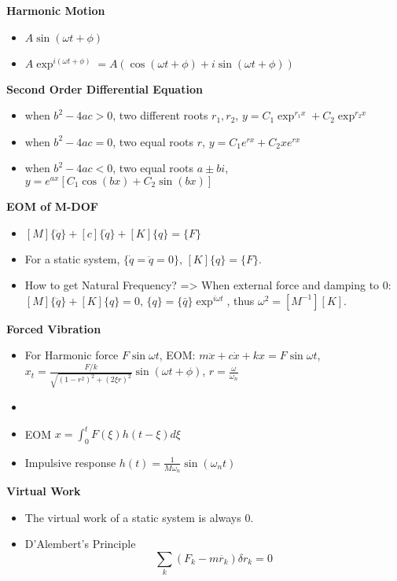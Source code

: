 \documentclass{article}
\begin{document}
\thispagestyle{empty}

\begin{multicols*}{2}

  \noindent\textbf{Harmonic Motion}
  \begin{itemize}
    \item $A \sin(\omega t + \phi)$
    \item $A \exp^{i(\omega t + \phi)} = A(\cos(\omega t + \phi) + i\sin(\omega t + \phi))$
  \end{itemize}

  \noindent\textbf{Second Order Differential Equation}
  \begin{itemize}
  \item when $b^2 - 4ac > 0$, two different roots $r_1, r_2$, $y = C_1\exp^{r_1 x} + C_2\exp^{r_2 x}$
  \item when $b^2 - 4ac = 0$, two equal roots $r$, $y = C_1 e^{r x} + C_2 x e^{r x}$
  \item when $b^2 - 4ac < 0$, two equal roots $a \pm bi$, $y = e^{ax} [C_1 \cos(b x) + C_2 \sin(b x)]$
  \end{itemize}

  \noindent\textbf{EOM of M-DOF}
  \begin{itemize}
  \item $[M]\{\ddot{q}\} + [c]\{\dot{q}\} + [K]\{q\}=\{F\}$
  \item For a static system, $\{\dot{q} = \ddot{q} = 0\}$, $[K]\{q\}=\{F\}$.
  \item How to get Natural Frequency? => When external force and damping to 0:
    $[M]\{\ddot{q}\} + [K]\{q\} = 0$, $\{q\} = \{\bar{q}\}\exp^{i\omega t}$, thus $\omega^2 = [M^{-1}][K]$.
  \end{itemize}

  \noindent\textbf{Forced Vibration}
  \begin{itemize}
  \item For Harmonic force $F\sin\omega t$, EOM: $m\ddot{x} + c\dot{x} + kx = F\sin\omega t$, $x_t = \frac{F/k}{\sqrt{(1-r^2)^2+(2\xi r)^2}}\sin(\omega t + \phi)$, $r=\frac{\omega}{\omega_n}$
    \item
  \item EOM $x = \int_0^t F(\xi) h(t-\xi) d\xi$
  \item Impulsive response $h(t) = \frac{1}{M\omega_n}\sin(\omega_n t)$
  \end{itemize}

  \noindent\textbf{Virtual Work}
  \begin{itemize}
  \item The virtual work of a static system is always 0.
  \item D'Alembert's Principle
    \begin{equation*}
      \sum_k (F_k - m \ddot{r_k}) \delta r_k = 0
    \end{equation*}
  \end{itemize}


\end{multicols*}
\end{document}
